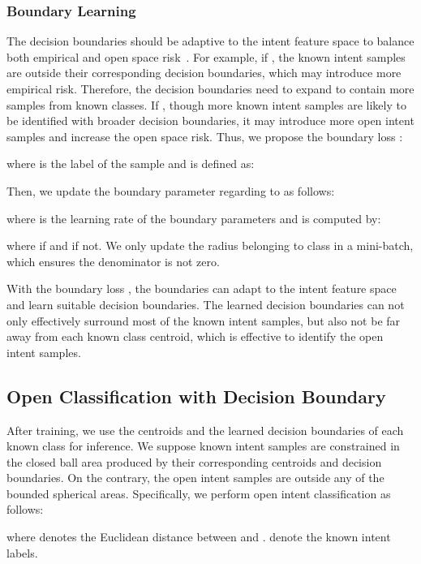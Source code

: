 \documentclass[letterpaper]{article} \usepackage{aaai21}  \usepackage{times}  \usepackage{helvet} \usepackage{courier}  \usepackage[hyphens]{url}  \usepackage{graphicx} \urlstyle{rm} \def\UrlFont{\rm}  \usepackage{natbib}  \usepackage{caption} \frenchspacing  \setlength{\pdfpagewidth}{8.5in}  \setlength{\pdfpageheight}{11in}  \usepackage{amsmath}
\begin{document}
	\subsubsection{Boundary Learning}
	The decision boundaries should be adaptive to the intent feature space to balance both empirical and open space risk~\cite{Bendale2015}. For example, if , the known intent samples are outside their corresponding decision boundaries, which may introduce more empirical risk. Therefore, the decision boundaries need to expand to contain more samples from known classes. If , though more known intent samples are likely to be identified with broader decision boundaries, it may introduce more open intent samples and increase the open space risk. Thus, we propose the boundary loss :
	
	where  is the label of the  sample and  is defined as:
	
	Then, we update the boundary parameter  regarding to  as follows:
	 
	where  is the learning rate of the boundary parameters  and  is computed by:
	
	where  if  and  if not. We only update the radius  belonging to class  in a mini-batch, which ensures the denominator is not zero. 
	
	With the boundary loss , the boundaries can adapt to the intent feature space and learn suitable decision boundaries. The learned decision boundaries can not only effectively surround most of the known intent samples, but also not be far away from each known class centroid, which is effective to identify the open intent samples.
	\subsection{Open Classification with Decision Boundary}
	After training, we use the centroids and the learned decision boundaries of each known class for inference. We suppose known intent samples are constrained in the closed ball area produced by their corresponding centroids and decision boundaries. On the contrary, the  open intent samples are outside any of the bounded spherical areas. Specifically, we perform open intent classification as follows:
	
	where  denotes the Euclidean distance between  and .  denote the known intent labels. 
\end{document}
